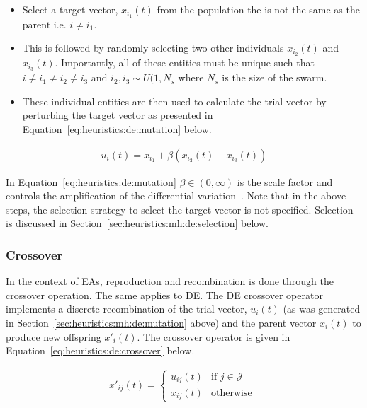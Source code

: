 \begin{itemize}
      \item Select a target vector, $x_{i_{1}}(t)$ from the population the is not the same as the parent i.e. $i \neq i_{1}$.
      \item This is followed by randomly selecting two other individuals $x_{i_{2}}(t)$ and $x_{i_{3}}(t)$. Importantly, all of these entities must be unique such that $i \neq i_{1} \neq i_{2} \neq i_{3}$ and $i_{2}, i_{3} \sim U(1, N_{s}$ where $N_{s}$ is the size of the swarm.
      \item These individual entities are then used to calculate the trial vector by perturbing the target vector as presented in Equation~\eqref{eq:heuristics:de:mutation} below.
\end{itemize}


\begin{equation}
      \label{eq:heuristics:de:mutation}
      \begin{split}
            u_{i}(t) = x_{i_{1}} + \beta(x_{i_{2}}(t) - x_{i_{3}}(t))
      \end{split}
\end{equation}

In Equation~\eqref{eq:heuristics:de:mutation} $\beta \in (0, \infty)$ is the scale factor and controls the amplification of the differential variation~\cite{ref:engelbrecht:2007}. Note that in the above steps, the selection strategy to select the target vector is not specified. Selection is discussed in Section~\ref{sec:heuristics:mh:de:selection} below.


\subsubsection{Crossover}
\label{sec:heuristics:mh:de:crossover}

In the context of \acp{EA}, reproduction and recombination is done through the crossover operation. The same applies to \acs{DE}. The \acs{DE} crossover operator implements a discrete recombination of the trial vector, $u_{i}(t)$ (as was generated in Section~\ref{sec:heuristics:mh:de:mutation} above) and the parent vector $x_{i}(t)$ to produce new offspring $x'_{i}(t)$. The crossover operator is given in Equation~\eqref{eq:heuristics:de:crossover} below.

\begin{equation}
      \label{eq:heuristics:de:crossover}
      \begin{split}
            x'_{ij}(t)=
            \begin{cases}
                  u_{ij}(t) & \text{if } j \in \mathcal{J} \\
                  x_{ij}(t) & \text{otherwise }
            \end{cases}
      \end{split}
\end{equation}

